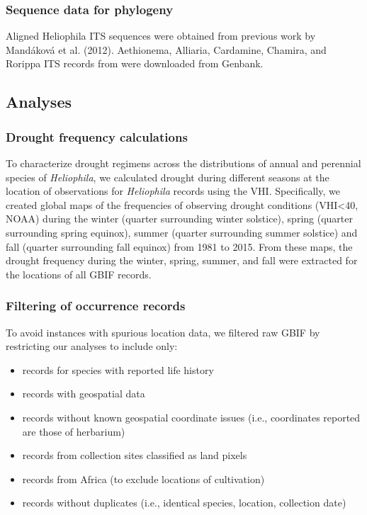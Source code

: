 \documentclass[man,floatsintext]{apa6}
\providecommand{\tightlist}{%
  \setlength{\itemsep}{0pt}\setlength{\parskip}{0pt}}
\theoremstyle{definition}
\theoremstyle{definition}
\theoremstyle{definition}
\theoremstyle{remark}
\begin{document}
\hypertarget{sequence-data-for-phylogeny}{%
\subsubsection{Sequence data for
phylogeny}\label{sequence-data-for-phylogeny}}

Aligned Heliophila ITS sequences were obtained from previous work by
Mandáková et al. (2012). Aethionema, Alliaria, Cardamine, Chamira, and
Rorippa ITS records from were downloaded from Genbank.

\hypertarget{analyses}{%
\subsection{Analyses}\label{analyses}}

\hypertarget{drought-frequency-calculations}{%
\subsubsection{Drought frequency
calculations}\label{drought-frequency-calculations}}

To characterize drought regimens across the distributions of annual and
perennial species of \emph{Heliophila}, we calculated drought during
different seasons at the location of observations for \emph{Heliophila}
records using the VHI. Specifically, we created global maps of the
frequencies of observing drought conditions (VHI\textless{}40, NOAA)
during the winter (quarter surrounding winter solstice), spring (quarter
surrounding spring equinox), summer (quarter surrounding summer
solstice) and fall (quarter surrounding fall equinox) from 1981 to 2015.
From these maps, the drought frequency during the winter, spring,
summer, and fall were extracted for the locations of all GBIF records.

\hypertarget{filtering-of-occurrence-records}{%
\subsubsection{Filtering of occurrence
records}\label{filtering-of-occurrence-records}}

To avoid instances with spurious location data, we filtered raw GBIF by
restricting our analyses to include only:

\begin{itemize}
\tightlist
\item
  records for species with reported life history\\
\item
  records with geospatial data\\
\item
  records without known geospatial coordinate issues (i.e., coordinates
  reported are those of herbarium)\\
\item
  records from collection sites classified as land pixels\\
\item
  records from Africa (to exclude locations of cultivation)
\item
  records without duplicates (i.e., identical species, location,
  collection date)
\end{itemize}
\end{document}
